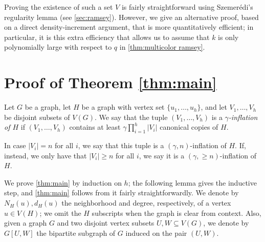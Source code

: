\documentclass[11pt]{article}
\numberwithin{equation}{section}
\theoremstyle{plain}
\theoremstyle{remark}
\newcommand\ab[1]{\lvert #1 \rvert}
\begin{document}
Proving the existence of such a set $V$ is fairly straightforward using Szemer\'edi's regularity lemma (see \cref{sec:ramsey}). However, we give an alternative proof, based on a direct density-increment argument, that is more quantitatively efficient; in particular, it is this extra efficiency that allows us to assume that $k$ is only polynomially large with respect to $q$ in \cref{thm:multicolor ramsey}.



\section{Proof of Theorem \ref{thm:main}}\label{sec:nikiforov}
\begin{definition}
    Let $G$ be a graph, let $H$ be a graph with vertex set $\{u_1,\dots,u_h\}$, and let $V_1,\dots,V_h$ be disjoint subsets of $V(G)$. We say that the tuple $(V_1,\dots,V_h)$ is a \emph{$\gamma$-inflation of $H$} if $(V_1,\dots,V_h)$ contains at least $\gamma \prod_{i=1}^h \ab{V_i}$ canonical copies of $H$.

    In case $\ab{V_i}=n$ for all $i$, we say that this tuple is a $(\gamma,n)$-inflation of $H$. If, instead, we only have that $\ab{V_i} \geq n$ for all $i$, we say it is a $(\gamma,{\geq n})$-inflation of $H$.
\end{definition}


We prove \cref{thm:main} by induction on $h$; the following lemma gives the inductive step, and \cref{thm:main} follows from it fairly straightforwardly. We denote by $N_H(u),d_H(u)$ the neighborhood and degree, respectively, of a vertex $u \in V(H)$; we omit the $H$ subscripts when the graph is clear from context. Also, given a graph $G$ and two disjoint vertex subsets $U,W \subseteq V(G)$, we denote by $G[U,W]$ the bipartite subgraph of $G$ induced on the pair $(U,W)$. 
\end{document}
